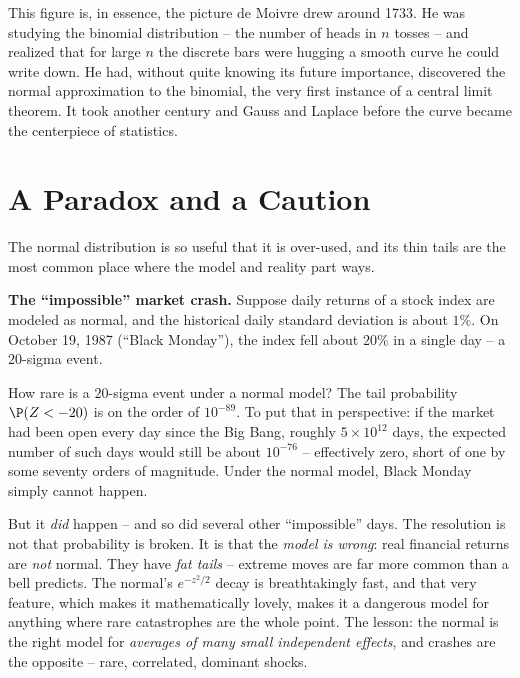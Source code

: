 \begin{historybox}
This figure is, in essence, the picture de Moivre drew around 1733. He was
studying the binomial distribution -- the number of heads in $n$ tosses -- and
realized that for large $n$ the discrete bars were hugging a smooth curve he could
write down. He had, without quite knowing its future importance, discovered the
normal approximation to the binomial, the very first instance of a central limit
theorem. It took another century and Gauss and Laplace before the curve became the
centerpiece of statistics.
\end{historybox}

\section{A Paradox and a Caution}
\label{ch12:paradox}

The normal distribution is so useful that it is over-used, and its thin tails are
the most common place where the model and reality part ways.

\begin{paradoxbox}
\textbf{The ``impossible'' market crash.} Suppose daily returns of a stock index
are modeled as normal, and the historical daily standard deviation is about $1\%$.
On October 19, 1987 (``Black Monday''), the index fell about $20\%$ in a single
day -- a $20$-sigma event.

How rare is a $20$-sigma event under a normal model? The tail probability
$\P(Z < -20)$ is on the order of $10^{-89}$. To put that in perspective: if the
market had been open every day since the Big Bang, roughly $5\times 10^{12}$ days,
the expected number of such days would still be about $10^{-76}$ -- effectively
zero, short of one by some seventy orders of magnitude. Under the normal model,
Black Monday simply cannot happen.

But it \emph{did} happen -- and so did several other ``impossible'' days. The
resolution is not that probability is broken. It is that the \emph{model is
wrong}: real financial returns are \emph{not} normal. They have \emph{fat tails}
-- extreme moves are far more common than a bell predicts. The normal's
$e^{-z^2/2}$ decay is breathtakingly fast, and that very feature, which makes it
mathematically lovely, makes it a dangerous model for anything where rare
catastrophes are the whole point. The lesson: the normal is the right model for
\emph{averages of many small independent effects}, and crashes are the opposite --
rare, correlated, dominant shocks.
\end{paradoxbox}

